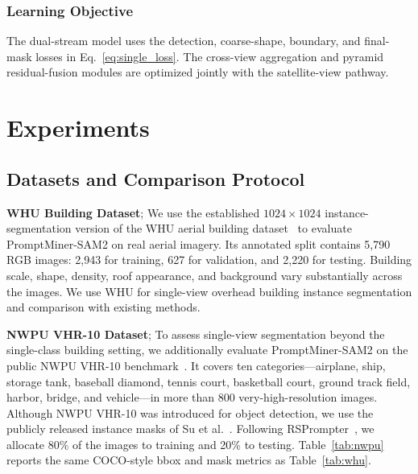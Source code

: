 \documentclass[letterpaper,journal]{IEEEtran}
\begin{document}
\subsubsection{Learning Objective}
The dual-stream model uses the detection, coarse-shape, boundary, and final-mask losses in
Eq.~\eqref{eq:single_loss}. The cross-view aggregation and pyramid residual-fusion modules are
optimized jointly with the satellite-view pathway.

\section{Experiments}
\label{sec:experiments}

\subsection{Datasets and Comparison Protocol}
\label{sec:experimental_datasets}

\noindent\textbf{WHU Building Dataset};
We use the established $1024\times1024$ instance-segmentation version of the WHU aerial
building dataset~\cite{ref_whu,ref_p2pformer} to evaluate PromptMiner-SAM2 on real aerial
imagery. Its annotated split contains 5,790 RGB images: 2,943 for training, 627 for validation,
and 2,220 for testing. Building scale, shape, density, roof appearance, and background vary
substantially across the images. We use WHU for single-view overhead building instance
segmentation and comparison with existing methods.

\noindent\textbf{NWPU VHR-10 Dataset};
To assess single-view segmentation beyond the single-class building setting, we additionally
evaluate PromptMiner-SAM2 on the public NWPU VHR-10 benchmark~\cite{ref_nwpu,ref_rsprompter}.
It covers ten categories---airplane, ship, storage tank, baseball diamond, tennis court,
basketball court, ground track field, harbor, bridge, and vehicle---in more than 800
very-high-resolution images. Although NWPU VHR-10 was introduced for object detection, we use
the publicly released instance masks of Su et al.~\cite{ref_nwpu_instance}. Following
RSPrompter~\cite{ref_rsprompter}, we allocate 80\% of the images to training and 20\% to testing.
Table~\ref{tab:nwpu} reports the same COCO-style bbox and mask metrics as
Table~\ref{tab:whu}.
\end{document}
